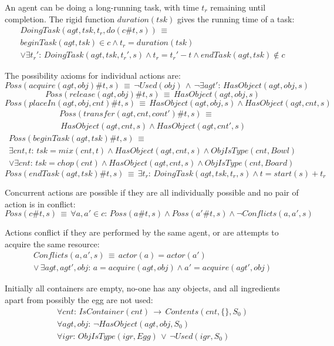 An agent can be doing a long-running task, with time $t_{r}$ remaining
until completion. The rigid function $duration(tsk)$ gives the running
time of a task:\begin{multline*}
DoingTask(agt,tsk,t_{r},do(c\#t,s))\,\equiv\,\\
beginTask(agt,tsk)\in c\wedge t_{r}=duration(tsk)\\
\vee\exists t_{r}':\, DoingTask(agt,tsk,t_{r}',s)\wedge t_{r}=t_{r}'-t\wedge endTask(agt,tsk)\not\in c\end{multline*}


The possibility axioms for individual actions are:\[
Poss(acquire(agt,obj)\#t,s)\,\equiv\,\neg Used(obj)\,\wedge\,\neg\exists agt':\, HasObject(agt,obj,s)\]
\[
Poss(release(agt,obj)\#t,s)\,\equiv\, HasObject(agt,obj,s)\]
\[
Poss(placeIn(agt,obj,cnt)\#t,s)\,\equiv\, HasObject(agt,obj,s)\wedge HasObject(agt,cnt,s)\]
\begin{multline*}
Poss(transfer(agt,cnt,cont')\#t,s)\,\equiv\\
\, HasObject(agt,cnt,s)\wedge HasObject(agt,cnt',s)\end{multline*}
\begin{multline*}
Poss(beginTask(agt,tsk)\#t,s)\,\equiv\,\\
\exists cnt,t:\, tsk=mix(cnt,t)\wedge HasObject(agt,cnt,s)\wedge ObjIsType(cnt,Bowl)\\
\vee\exists cnt:\, tsk=chop(cnt)\wedge HasObject(agt,cnt,s)\wedge ObjIsType(cnt,Board)\end{multline*}
\[
Poss(endTask(agt,tsk)\#t,s)\,\equiv\,\exists t_{r}:\, DoingTask(agt,tsk,t_{r},s)\wedge t=start(s)+t_{r}\]


Concurrent actions are possible if they are all individually possible
and no pair of action is in conflict:\[
Poss(c\#t,s)\,\equiv\,\forall a,a'\in c:\, Poss(a\#t,s)\wedge Poss(a'\#t,s)\wedge\neg Conflicts(a,a',s)\]


Actions conflict if they are performed by the same agent, or are attempts
to acquire the same resource:\begin{multline*}
Conflicts(a,a',s)\,\equiv\, actor(a)=actor(a')\\
\vee\,\exists agt,agt',obj:\, a=acquire(agt,obj)\wedge a'=acquire(agt',obj)\end{multline*}


Initially all containers are empty, no-one has any objects, and all
ingredients apart from possibly the egg are not used:\begin{gather*}
\forall cnt:\, IsContainer(cnt)\,\rightarrow\, Contents(cnt,\{\},S_{0})\\
\forall agt,obj:\,\neg HasObject(agt,obj,S_{0})\\
\forall igr:\, ObjIsType(igr,Egg)\,\vee\,\neg Used(igr,S_{0})\end{gather*}


